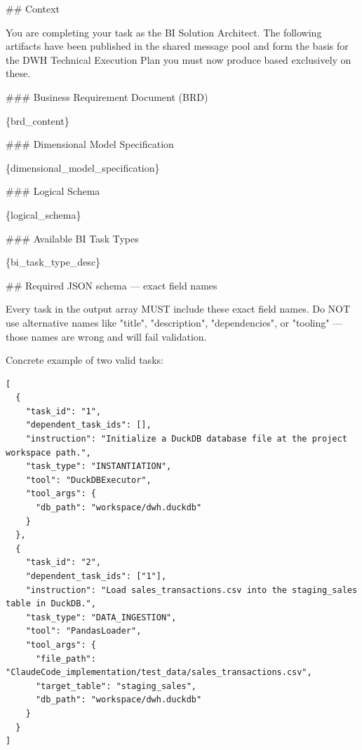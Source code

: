 \#\# Context
\newline

You are completing your task as the BI Solution Architect. The following artifacts have been published in the shared message pool and form the basis for the DWH Technical Execution Plan you must now produce based exclusively on these.
\newline

\#\#\# Business Requirement Document (BRD)
\newline

\{brd\_content\}
\newline

\#\#\# Dimensional Model Specification
\newline

\{dimensional\_model\_specification\}
\newline

\#\#\# Logical Schema
\newline

\{logical\_schema\}
\newline

\#\#\# Available BI Task Types
\newline

\{bi\_task\_type\_desc\}
\newline

\#\# Required JSON schema — exact field names
\newline

Every task in the output array MUST include these exact field names. Do NOT use alternative names like "title", "description", "dependencies", or "tooling" — those names are wrong and will fail validation.
\newline

Concrete example of two valid tasks:
\newline

\begin{verbatim}
[
  {
    "task_id": "1",
    "dependent_task_ids": [],
    "instruction": "Initialize a DuckDB database file at the project workspace path.",
    "task_type": "INSTANTIATION",
    "tool": "DuckDBExecutor",
    "tool_args": {
      "db_path": "workspace/dwh.duckdb"
    }
  },
  {
    "task_id": "2",
    "dependent_task_ids": ["1"],
    "instruction": "Load sales_transactions.csv into the staging_sales table in DuckDB.",
    "task_type": "DATA_INGESTION",
    "tool": "PandasLoader",
    "tool_args": {
      "file_path": "ClaudeCode_implementation/test_data/sales_transactions.csv",
      "target_table": "staging_sales",
      "db_path": "workspace/dwh.duckdb"
    }
  }
]
\end{verbatim}

